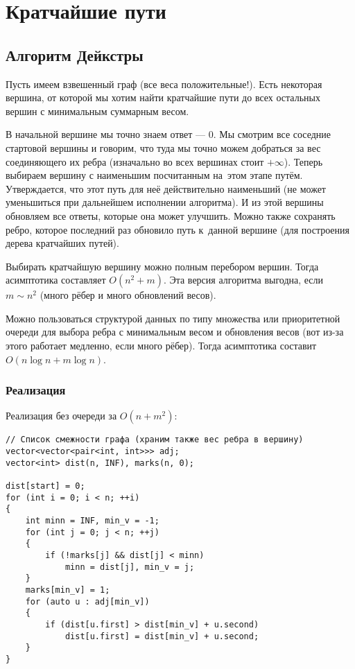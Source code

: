 \section{Кратчайшие пути}

\subsection{Алгоритм Дейкстры}

Пусть имеем взвешенный граф (все веса положительные!). Есть некоторая вершина, от которой мы хотим найти кратчайшие пути до всех остальных вершин с минимальным суммарным весом.

В начальной вершине мы точно знаем ответ --- $0$. Мы смотрим все соседние стартовой вершины и говорим, что туда мы точно можем добраться за вес соединяющего их ребра (изначально во всех вершинах стоит $+\infty$). Теперь выбираем вершину с наименьшим посчитанным на~этом этапе путём. Утверждается, что этот путь для неё действительно наименьший (не может уменьшиться при дальнейшем исполнении алгоритма). И из этой вершины обновляем все ответы, которые она может улучшить. Можно также сохранять ребро, которое последний раз обновило путь к~данной вершине (для построения дерева кратчайших путей).

Выбирать кратчайшую вершину можно полным перебором вершин. Тогда асимптотика составляет $O(n^2 + m)$. Эта версия алгоритма выгодна, если $m \sim n^2$ (много рёбер и много обновлений весов).

Можно пользоваться структурой данных по типу множества или приоритетной очереди для выбора ребра с минимальным весом и обновления весов (вот из-за этого работает медленно, если много рёбер). Тогда асимптотика составит $O(n\log n + m\log n)$.

\subsubsection{Реализация}

\noindent
Реализация без очереди за $O(n + m^2)$:

\begin{verbatim}
// Список смежности графа (храним также вес ребра в вершину)
vector<vector<pair<int, int>>> adj;
vector<int> dist(n, INF), marks(n, 0);

dist[start] = 0;
for (int i = 0; i < n; ++i)
{
    int minn = INF, min_v = -1;
    for (int j = 0; j < n; ++j)
    {
        if (!marks[j] && dist[j] < minn)
            minn = dist[j], min_v = j;
    }
    marks[min_v] = 1;
    for (auto u : adj[min_v])
    {
        if (dist[u.first] > dist[min_v] + u.second)
            dist[u.first] = dist[min_v] + u.second;
    }
}

\end{verbatim}

